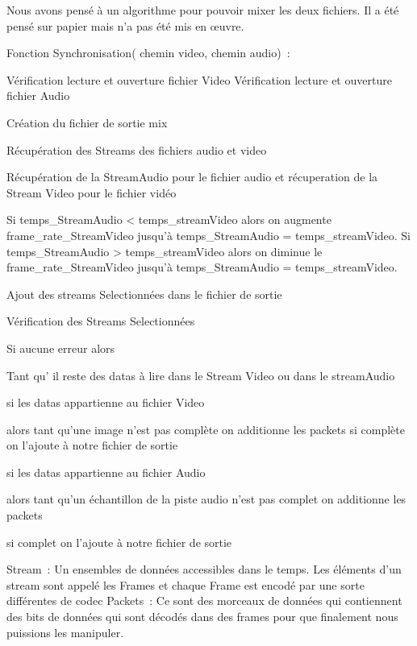Nous avons pensé à un algorithme pour pouvoir mixer les deux fichiers. Il a été pensé sur papier mais n'a pas été mis en œuvre.

\begin{verbnobox}[\small]

Fonction Synchronisation( chemin video, chemin audio) :

Vérification lecture et ouverture fichier Video
Vérification lecture et ouverture  fichier Audio

Création du fichier de sortie mix

Récupération des Streams des fichiers audio et video

Récupération de la StreamAudio pour le fichier audio et récuperation de la Stream Video pour le fichier vidéo

Si temps_StreamAudio < temps_streamVideo alors on augmente frame_rate_StreamVideo jusqu'à temps_StreamAudio = temps_streamVideo.
Si temps_StreamAudio > temps_streamVideo alors on diminue le  frame_rate_StreamVideo jusqu'à temps_StreamAudio = temps_streamVideo.

Ajout des streams Selectionnées dans le fichier de sortie

Vérification des Streams Selectionnées

Si aucune erreur alors 

	Tant qu' il reste des datas à lire dans le Stream Video ou dans le streamAudio
		
		si les datas appartienne au fichier Video
		
			alors tant qu'une image n'est pas complète on additionne les packets
			si complète on l'ajoute à notre fichier de sortie


		si les datas appartienne au fichier Audio
		
			alors tant qu'un échantillon de la piste audio n'est pas complet on additionne les packets

			si complet on l'ajoute à notre fichier de sortie

\end{verbnobox}

Stream : Un ensembles de données accessibles dans le temps. Les éléments d'un stream sont appelé les Frames et chaque Frame est encodé par une sorte différentes de codec
Packets : Ce sont des morceaux de données qui contiennent des bits de données qui sont décodés dans des frames pour que finalement nous puissions les manipuler.